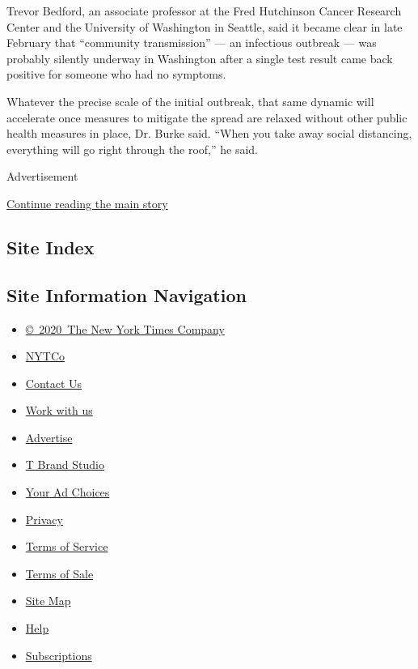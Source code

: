 Trevor Bedford, an associate professor at the Fred Hutchinson Cancer
Research Center and the University of Washington in Seattle, said it
became clear in late February that ``community transmission'' --- an
infectious outbreak --- was probably silently underway in Washington
after a single test result came back positive for someone who had no
symptoms.

Whatever the precise scale of the initial outbreak, that same dynamic
will accelerate once measures to mitigate the spread are relaxed without
other public health measures in place, Dr. Burke said. ``When you take
away social distancing, everything will go right through the roof,'' he
said.

Advertisement

\protect\hyperlink{after-bottom}{Continue reading the main story}

\hypertarget{site-index}{%
\subsection{Site Index}\label{site-index}}

\hypertarget{site-information-navigation}{%
\subsection{Site Information
Navigation}\label{site-information-navigation}}

\begin{itemize}
\tightlist
\item
  \href{https://help.nytimes.com/hc/en-us/articles/115014792127-Copyright-notice}{©~2020~The
  New York Times Company}
\end{itemize}

\begin{itemize}
\tightlist
\item
  \href{https://www.nytco.com/}{NYTCo}
\item
  \href{https://help.nytimes.com/hc/en-us/articles/115015385887-Contact-Us}{Contact
  Us}
\item
  \href{https://www.nytco.com/careers/}{Work with us}
\item
  \href{https://nytmediakit.com/}{Advertise}
\item
  \href{http://www.tbrandstudio.com/}{T Brand Studio}
\item
  \href{https://www.nytimes.com/privacy/cookie-policy\#how-do-i-manage-trackers}{Your
  Ad Choices}
\item
  \href{https://www.nytimes.com/privacy}{Privacy}
\item
  \href{https://help.nytimes.com/hc/en-us/articles/115014893428-Terms-of-service}{Terms
  of Service}
\item
  \href{https://help.nytimes.com/hc/en-us/articles/115014893968-Terms-of-sale}{Terms
  of Sale}
\item
  \href{https://spiderbites.nytimes.com}{Site Map}
\item
  \href{https://help.nytimes.com/hc/en-us}{Help}
\item
  \href{https://www.nytimes.com/subscription?campaignId=37WXW}{Subscriptions}
\end{itemize}

